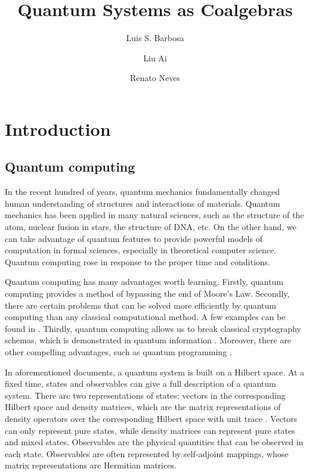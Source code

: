 \documentclass[a4paper, 11pt]{article}
\begin{document}
\title{Quantum Systems as Coalgebras}
\author{Luis S. Barbosa \and Liu Ai \and Renato Neves}
\maketitle

\section{Introduction}

\subsection{Quantum computing}

In the recent hundred of years, quantum mechanics fundamentally changed human understanding of structures and interactions of materials. Quantum mechanics has been applied in many natural sciences, such as the structure of the atom, nuclear fusion in stars, the structure of DNA, etc. On the other hand, we can take advantage of quantum features to provide powerful models of computation in formal sciences, especially in theoretical computer science. Quantum computing rose in response to the proper time and conditions. 

Quantum computing has many advantages worth learning. Firstly, quantum computing provides a method of bypassing the end of Moore's Law. Secondly, there are certain problems that can be solved more efficiently by quantum computing than  any classical computational method. A few examples can be found in \cite{NM08}. Thirdly, quantum computing allows us to break classical cryptography schemas, which is demonstrated in quantum information \cite{nielsen2002quantum}. Moreover, there are other compelling advantages, such as quantum programming \cite{ying16}.

In aforementioned documents, a quantum system is built on a Hilbert space. At a fixed time, states and observables can give a full description of a quantum system. There are two representations of states: vectors in the corresponding Hilbert space and density matrices, which are the matrix representations of density operators over the corresponding Hilbert space with unit trace . Vectors can only represent pure states, while density matrices can represent pure states and mixed states. Observables are the physical quantities that can be observed in each state. Observables are often represented by self-adjoint mappings, whose matrix representations are Hermitian matrices. 
\end{document}
